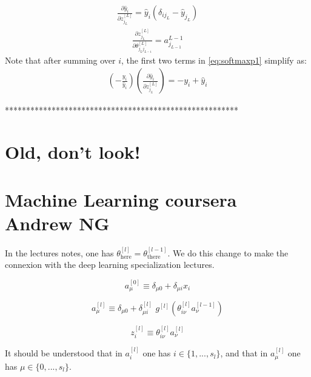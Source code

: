 \documentclass[a4paper,11pt]{article}
\newcommand{\na}[2]{a_{#1}^{[#2]}}
\newcommand{\nz}[2]{z_{#1}^{[#2]}}
\newcommand{\nt}[3]{\theta_{#1 #2}^{[#3]}}
\newcommand{\ff}[2]{#1 \left(#2 \right)}
\begin{document}
\begin{align}
 \frac{ \partial \hat{y}_i}{\partial z_{j_L}^{[L]} } =\hat{y}_i(  \delta_{i j_L} -   \hat{y}_{j_L}) 
 \label{eq:softmaxp2}
\end{align}
\begin{align}
\frac{ \partial z_{j_L}^{[L]} } {\partial  \nt{j_L}{j_{L-1}}{L}  }  =  a^{L-1}_{j_{L-1}}
\label{eq:softmaxp3}
\end{align}
Note that after summing over $i$, the first two terms in \eqref{eq:softmaxp1} simplify as:
\begin{eqnarray}
   \left( -  \frac{y_i }{ \hat{y}_i} \right) \left(  \frac{ \partial \hat{y}_i}{\partial z_{j_L}^{[L]} }    \right) = - y_i + \hat{y}_i
\end{eqnarray}


*******************************************************

\section{Old, don't look!}





\section{Machine Learning coursera Andrew NG}

In the lectures notes, one has 
$\theta^{[l]}_{\text{here}}=\theta^{[l-1]}_{\text{there}}$.
We do this change to make the connexion with the 
deep learning specialization lectures.

\begin{equation}
    \na{\mu}{0} \equiv \delta_{\mu0}+\delta_{\mu i} x_i %
\end{equation}

\begin{equation}
    \na{\mu}{l} \equiv \delta_{\mu0} +\delta_{\mu i }^{[l]}\,\,
    \ff{g^{[l]}}{  \nt{i}{\nu}{l}\na{\nu }{l-1}  }  %
\end{equation}

\begin{equation}
    \nz{i}{l}\equiv \nt{i}{\nu}{l}\na{\nu }{l} %
\end{equation}



It should be understood that in $\na{i}{l}$ 
one has  $i \in \{1,..., s_l\} $, 
and that in $\na{\mu}{l}$ one has $ \mu \in \{0,..., s_l\}$.
\end{document}
